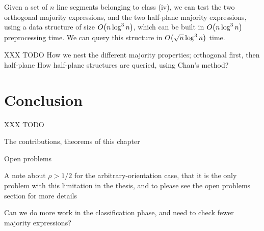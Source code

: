 \begin{lemma}
\label{lem:rect:ao:step3}
Given a set of $n$ line segments belonging to class (iv), we can test the two orthogonal majority expressions, and the two half-plane majority expressions, using a data structure of size $O\!\left(n\log^3{n}\right)$, which can be built in $O\!\left(n\log^3{n}\right)$ preprocessing time. We can query this structure in $O\!\left(\sqrt{n}\log^3{n}\right)$ time.
\end{lemma}




XXX TODO
How we nest the different majority properties; orthogonal first, then half-plane
How half-plane structures are queried, using Chan's method?




\section{Conclusion}
\label{:rectangles:concl}

XXX TODO

The contributions, theorems of this chapter

Open problems

A note about $\rho > 1/2$ for the arbitrary-orientation case, that it is the only problem with this limitation in the thesis, and to please see the open problems section for more details

Can we do more work in the classification phase, and need to check fewer majority expressions?
